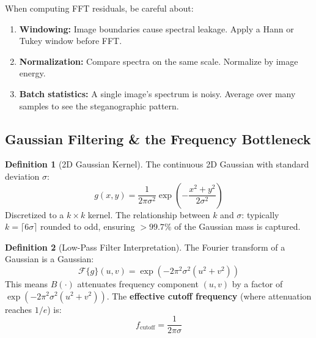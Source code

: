 \documentclass[11pt,a4paper]{article}
\theoremstyle{definition}
\newtheorem{definition}{Definition}[section]
\begin{document}
\begin{edgecase}
When computing FFT residuals, be careful about:
\begin{enumerate}
    \item \textbf{Windowing:} Image boundaries cause spectral leakage. Apply a Hann or Tukey window before FFT.
    \item \textbf{Normalization:} Compare spectra on the same scale. Normalize by image energy.
    \item \textbf{Batch statistics:} A single image's spectrum is noisy. Average over many samples to see the steganographic pattern.
\end{enumerate}
\end{edgecase}

\subsection{Gaussian Filtering \& the Frequency Bottleneck}

\begin{definition}[2D Gaussian Kernel]
The continuous 2D Gaussian with standard deviation $\sigma$:
\begin{equation}
    g(x,y) = \frac{1}{2\pi\sigma^2} \exp\left(-\frac{x^2+y^2}{2\sigma^2}\right)
\end{equation}
Discretized to a $k \times k$ kernel. The relationship between $k$ and $\sigma$: typically $k = \lceil 6\sigma \rceil$ rounded to odd, ensuring $>99.7\%$ of the Gaussian mass is captured.
\end{definition}

\begin{definition}[Low-Pass Filter Interpretation]
The Fourier transform of a Gaussian is a Gaussian:
\begin{equation}
    \mathcal{F}\{g\}(u,v) = \exp\left(-2\pi^2\sigma^2(u^2+v^2)\right)
\end{equation}
This means $B(\cdot)$ attenuates frequency component $(u,v)$ by a factor of $\exp(-2\pi^2\sigma^2(u^2+v^2))$. The \textbf{effective cutoff frequency} (where attenuation reaches $1/e$) is:
\begin{equation}
    f_{\text{cutoff}} = \frac{1}{2\pi\sigma}
\end{equation}
\end{definition}
\end{document}
